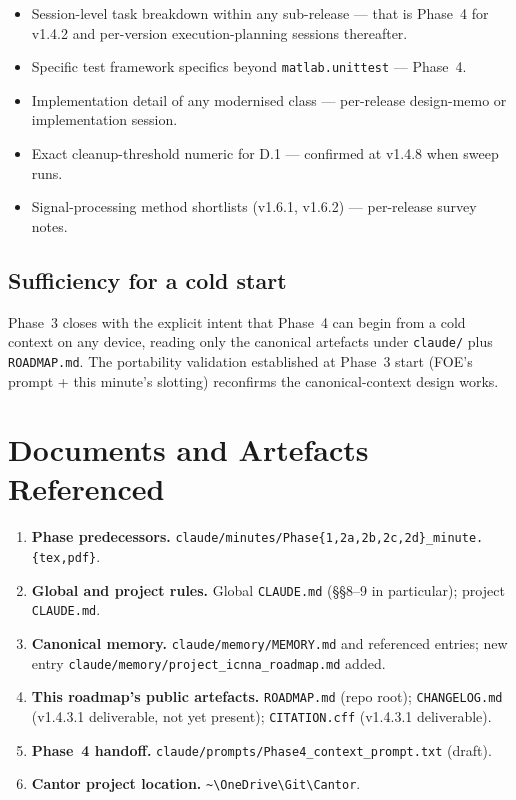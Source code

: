\documentclass[11pt,a4paper]{article}
\begin{document}
\begin{itemize}[nosep]
    \item Session-level task breakdown within any sub-release --- that is Phase~4 for v1.4.2 and per-version execution-planning sessions thereafter.
    \item Specific test framework specifics beyond \texttt{matlab.unittest} --- Phase~4.
    \item Implementation detail of any modernised class --- per-release design-memo or implementation session.
    \item Exact cleanup-threshold numeric for D.1 --- confirmed at v1.4.8 when sweep runs.
    \item Signal-processing method shortlists (v1.6.1, v1.6.2) --- per-release survey notes.
\end{itemize}

\subsection{Sufficiency for a cold start}

Phase~3 closes with the explicit intent that Phase~4 can begin from a cold context on any device, reading only the canonical artefacts under \texttt{claude/} plus \texttt{ROADMAP.md}. The portability validation established at Phase~3 start (FOE's prompt + this minute's slotting) reconfirms the canonical-context design works.

\section{Documents and Artefacts Referenced}

\begin{enumerate}
    \item \textbf{Phase predecessors.} \texttt{claude/minutes/Phase\{1,2a,2b,2c,2d\}\_minute.\{tex,pdf\}}.
    \item \textbf{Global and project rules.} Global \texttt{CLAUDE.md} (\S\S8--9 in particular); project \texttt{CLAUDE.md}.
    \item \textbf{Canonical memory.} \texttt{claude/memory/MEMORY.md} and referenced entries; new entry \texttt{claude/memory/project\_icnna\_roadmap.md} added.
    \item \textbf{This roadmap's public artefacts.} \texttt{ROADMAP.md} (repo root); \texttt{CHANGELOG.md} (v1.4.3.1 deliverable, not yet present); \texttt{CITATION.cff} (v1.4.3.1 deliverable).
    \item \textbf{Phase~4 handoff.} \texttt{claude/prompts/Phase4\_context\_prompt.txt} (draft).
    \item \textbf{Cantor project location.} \texttt{\textasciitilde\textbackslash OneDrive\textbackslash Git\textbackslash Cantor}.
\end{enumerate}
\end{document}
